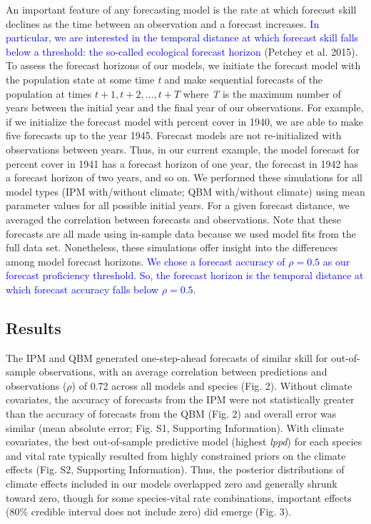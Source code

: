 \documentclass[12pt,]{article}
\begin{document}
An important feature of any forecasting model is the rate at which
forecast skill declines as the time between an observation and a
forecast increases.
\textcolor{blue}{In particular, we are interested in the temporal distance at which forecast skill falls below a threshold: the so-called ecological forecast horizon}
(Petchey et al. 2015). To assess the forecast horizons of our models, we
initiate the forecast model with the population state at some time
\emph{t} and make sequential forecasts of the population at times
\(t+1, t+2, \dots, t+T\) where \emph{T} is the maximum number of years
between the initial year and the final year of our observations. For
example, if we initialize the forecast model with percent cover in 1940,
we are able to make five forecasts up to the year 1945. Forecast models
are not re-initialized with observations between years. Thus, in our
current example, the model forecast for percent cover in 1941 has a
forecast horizon of one year, the forecast in 1942 has a forecast
horizon of two years, and so on. We performed these simulations for all
model types (IPM with/without climate; QBM with/without climate) using
mean parameter values for all possible initial years. For a given
forecast distance, we averaged the correlation between forecasts and
observations. Note that these forecasts are all made using in-sample
data because we used model fits from the full data set. Nonetheless,
these simulations offer insight into the differences among model
forecast horizons.
\textcolor{blue}{We chose a forecast accuracy of $\rho = 0.5$ as our forecast proficiency threshold.
So, the forecast horizon is the temporal distance at which forecast accuracy falls below $\rho = 0.5$.}

\subsection{Results}\label{results}

The IPM and QBM generated one-step-ahead forecasts of similar skill for
out-of-sample observations, with an average correlation between
predictions and observations (\(\rho\)) of 0.72 across all models and
species (Fig. 2). Without climate covariates, the accuracy of forecasts
from the IPM were not statistically greater than the accuracy of
forecasts from the QBM (Fig. 2) and overall error was similar (mean
absolute error; Fig. S1, Supporting Information). With climate
covariates, the best out-of-sample predictive model (highest
\emph{lppd}) for each species and vital rate typically resulted from
highly constrained priors on the climate effects (Fig. S2, Supporting
Information). Thus, the posterior distributions of climate effects
included in our models overlapped zero and generally shrunk toward zero,
though for some species-vital rate combinations, important effects (80\%
credible interval does not include zero) did emerge (Fig. 3).
\end{document}

